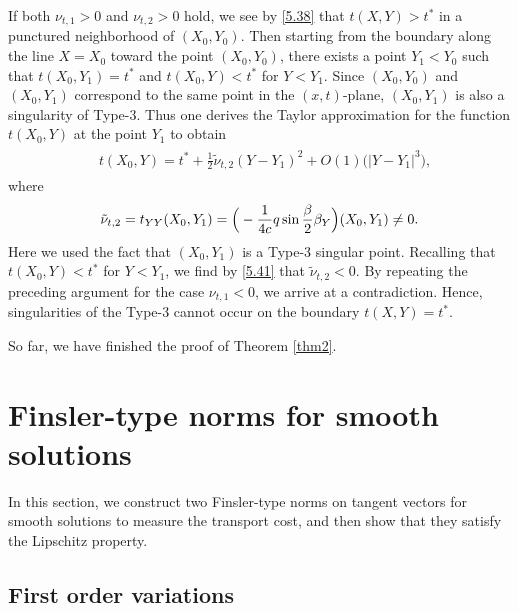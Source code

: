 \documentclass[11pt,reqno]{article}
\newcommand{\fr}{\frac}
\numberwithin{equation}{section}
\begin{document}
If both $\nu_{t,1}>0$ and $\nu_{t,2}>0$ hold, we see by \eqref{5.38} that $t(X, Y)>t^*$ in a punctured neighborhood of $(X_0, Y_0)$. Then starting from the boundary along the line $X=X_0$ toward the point $(X_0,Y_0)$, there exists a point $Y_1<Y_0$ such that $t(X_0,Y_1)=t^*$ and $t(X_0,Y)<t^*$ for $Y<Y_1$.
Since $(X_0,Y_0)$ and $(X_0,Y_1)$ correspond to the same point in the $(x,t)$-plane, $(X_0,Y_1)$ is also a singularity of Type-3. Thus one derives the Taylor approximation for the function $t(X_0, Y)$ at the point $Y_1$ to obtain
\begin{align}\label{5.41}
\begin{split}
&t(X_0,Y)=t^* +\fr{1}{2}\tilde\nu_{t,2}(Y-Y_1)^2   +O(1)\Big(|Y-Y_1|^3 \Big),
\end{split}
\end{align}
where
\begin{align}
\begin{split}
\tilde\nu_{t,2}=t_{YY}(X_0,Y_1)= \Big( -\fr{1}{4c}q\sin\fr{\beta}{2}\beta_Y\Big)(X_0,Y_1)\neq0. \notag
\end{split}
\end{align}
Here we used the fact that $(X_0,Y_1)$ is a Type-3 singular point. Recalling that $t(X_0,Y)<t^*$ for $Y<Y_1$, we find by \eqref{5.41} that $\tilde\nu_{t,2}<0$. By repeating the preceding argument for the case $\nu_{t,1}<0$, we arrive at a contradiction. Hence, singularities of the Type-3 cannot occur on the boundary $t(X,Y)=t^*$.

So far, we have finished the proof of Theorem \ref{thm2}.





\section{Finsler-type norms for smooth solutions}\label{S6}


In this section, we construct two Finsler-type norms on tangent vectors for smooth solutions to measure the transport cost, and then show that they satisfy the Lipschitz property.


\subsection{First order variations}\label{S61}
\end{document}
